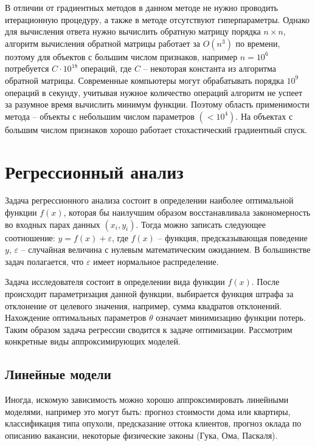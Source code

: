 В отличии от градиентных методов в данном методе не нужно проводить итерационную процедуру, а также в методе отсутствуют гиперпараметры. Однако для вычисления ответа нужно вычислить обратную матрицу порядка $n \times n$, алгоритм вычисления обратной матрицы работает за $O(n^3)$ по времени, поэтому для объектов с большим числом признаков, например $n=10^6$ потребуется $C \cdot 10^{18}$ операций, где $C$ -- некоторая константа из алгоритма обратной матрицы. Современные компьютеры могут обрабатывать порядка $10^9$ операций в секунду, учитывая нужное количество операций алгоритм не успеет за разумное время вычислить минимум функции. Поэтому область применимости метода -- объекты с небольшим числом параметров $(< 10^4)$. На объектах с большим числом признаков хорошо работает стохастический градиентный спуск.



\section{Регрессионный анализ}

Задача регрессионного анализа состоит в определении наиболее оптимальной функции $f(x)$, которая бы наилучшим образом восстанавливала закономерность во входных парах данных $(x_i, y_i)$. Тогда можно записать следующее соотношение: $y = f(x) + \varepsilon$, где $f(x)$ -- функция, предсказывающая поведение $y$, $\varepsilon$ -- случайная величина с нулевым математическим ожиданием. В большинстве задач полагается, что $\varepsilon$ имеет нормальное распределение.

Задача исследователя состоит в определении вида функции $f(x)$. После происходит параметризация данной функции, выбирается функция штрафа за отклонение от целевого значения, например, сумма квадратов отклонений. Нахождение оптимальных параметров $\theta$ означает минимизацию функции потерь. Таким образом задача регрессии сводится к задаче оптимизации. Рассмотрим конкретные виды аппроксимирующих моделей.


\subsection{Линейные модели}

Иногда, искомую зависимость можно хорошо аппроксимировать линейными моделями, например это могут быть: прогноз стоимости дома или квартиры, классификация типа опухоли, предсказание оттока клиентов, прогноз оклада по описанию вакансии, некоторые физические законы (Гука, Ома, Паскаля).


